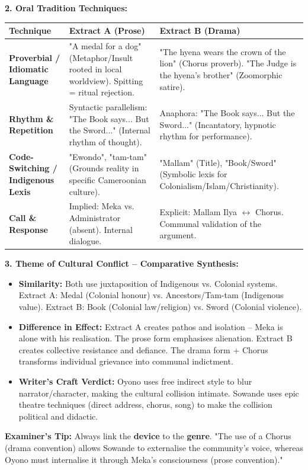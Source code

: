 \documentclass[11pt]{article}
\newcommand{\cle}[1]{{\popxbold\color{popdark}#1}}
\begin{document}
\begin{exoresolu}
\textbf{2. Oral Tradition Techniques:}
\begin{center}
\begin{tabularx}{\linewidth}{|l|X|X|}
\hline
\rowcolor{popblueL} \textbf{Technique} & \textbf{Extract A (Prose)} & \textbf{Extract B (Drama)} \\
\hline
\textbf{Proverbial / Idiomatic Language} & "A medal for a dog" (Metaphor/Insult rooted in local worldview). Spitting = ritual rejection. & "The hyena wears the crown of the lion" (Chorus proverb). "The Judge is the hyena's brother" (Zoomorphic satire). \\
\hline
\textbf{Rhythm \& Repetition} & Syntactic parallelism: "The Book says... But the Sword..." (Internal rhythm of thought). & \cle{Anaphora}: "The Book says... But the Sword..." (Incantatory, hypnotic rhythm for performance). \\
\hline
\textbf{Code-Switching / Indigenous Lexis} & "Ewondo", "tam-tam" (Grounds reality in specific Cameroonian culture). & "Mallam" (Title), "Book/Sword" (Symbolic lexis for Colonialism/Islam/Christianity). \\
\hline
\textbf{Call \& Response} & Implied: Meka vs. Administrator (absent). Internal dialogue. & Explicit: Mallam Ilya $\leftrightarrow$ Chorus. Communal validation of the argument. \\
\hline
\end{tabularx}
\end{center}

\textbf{3. Theme of Cultural Conflict -- Comparative Synthesis:}
\begin{itemize}
    \item \textbf{Similarity:} Both use \cle{juxtaposition} of Indigenous vs. Colonial systems. Extract A: Medal (Colonial honour) vs. Ancestors/Tam-tam (Indigenous value). Extract B: Book (Colonial law/religion) vs. Sword (Colonial violence).
    \item \textbf{Difference in Effect:} Extract A creates \cle{pathos} and \cle{isolation} -- Meka is alone with his realisation. The prose form emphasises \cle{alienation}. Extract B creates \cle{collective resistance} and \cle{defiance}. The drama form + Chorus transforms individual grievance into \cle{communal indictment}.
    \item \textbf{Writer's Craft Verdict:} Oyono uses \cle{free indirect style} to blur narrator/character, making the cultural collision intimate. Sowande uses \cle{epic theatre} techniques (direct address, chorus, song) to make the collision political and didactic.
\end{itemize}

\textbf{Examiner's Tip:} Always link the \textbf{device} to the \textbf{genre}. "The use of a Chorus (drama convention) allows Sowande to externalise the community's voice, whereas Oyono must internalise it through Meka's consciousness (prose convention)."
\end{exoresolu}
\end{document}
